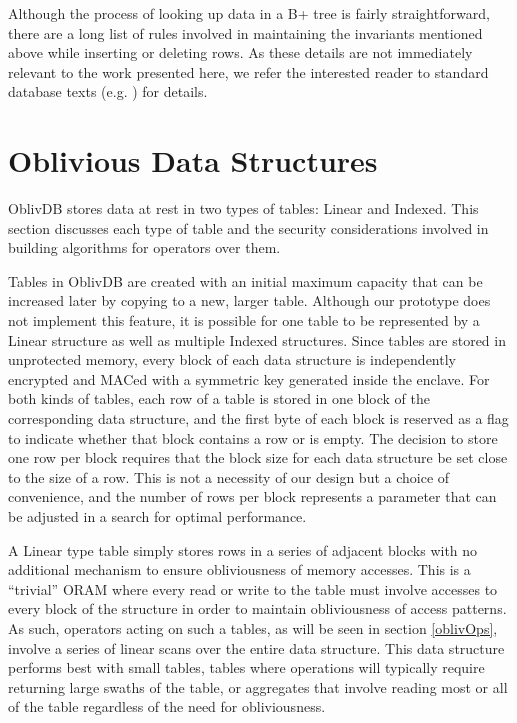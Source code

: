 \documentclass[USenglish,oneside,twocolumn]{article}
\def\name/{OblivDB}
\begin{document}
Although the process of looking up data in a B+ tree is fairly straightforward, there are a long list of rules involved in maintaining the invariants mentioned above while inserting or deleting rows. As these details are not immediately relevant to the work presented here, we refer the interested reader to standard database texts (e.g. \cite{EN10}) for details. 

\section{Oblivious Data Structures}\label{oblivData}
\name/ stores data at rest in two types of tables: Linear and Indexed. This section discusses each type of table and the security considerations involved in building algorithms for operators over them. 

Tables in \name/ are created with an initial maximum capacity that can be increased later by copying to a new, larger table. Although our prototype does not implement this feature, it is possible for one table to be represented by a Linear structure as well as multiple Indexed structures. Since tables are stored in unprotected memory, every block of each data structure is independently encrypted and MACed with a symmetric key generated inside the enclave. For both kinds of tables, each row of a table is stored in one block of the corresponding data structure, and the first byte of each block is reserved as a flag to indicate whether that block contains a row or is empty. The decision to store one row per block requires that the block size for each data structure be set close to the size of a row. This is not a necessity of our design but a choice of convenience, and the number of rows per block represents a parameter that can be adjusted in a search for optimal performance.

A Linear type table simply stores rows in a series of adjacent blocks with no additional mechanism to ensure obliviousness of memory accesses. This is a ``trivial'' ORAM where every read or write to the table must involve accesses to every block of the structure in order to maintain obliviousness of access patterns. As such, operators acting on such a tables, as will be seen in section \ref{oblivOps}, involve a series of linear scans over the entire data structure. This data structure performs best with small tables, tables where operations will typically require returning large swaths of the table, or aggregates that involve reading most or all of the table regardless of the need for obliviousness.
\end{document}
